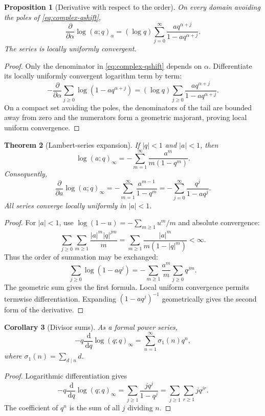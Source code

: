 \documentclass[11pt,oneside,openany]{book}
\newtheorem{theorem}{Theorem}[chapter]
\newtheorem{proposition}[theorem]{Proposition}
\newtheorem{corollary}[theorem]{Corollary}
\theoremstyle{definition}
\theoremstyle{remark}
\newcommand{\dd}{\,\mathrm d}
\newcommand{\abs}[1]{\lvert #1\rvert}
\begin{document}
\begin{proposition}[Derivative with respect to the order]\label{prop:order-derivative}
On every domain avoiding the poles of \eqref{eq:complex-qshift},
\[
 \frac{\partial}{\partial\alpha}\log(a;q)_\alpha
 =(\log q)\sum_{j=0}^{\infty}
 \frac{aq^{\alpha+j}}{1-aq^{\alpha+j}}.
 \tag{1.4}\label{eq:order-derivative}
\]
The series is locally uniformly convergent.
\end{proposition}

\begin{proof}
Only the denominator in \eqref{eq:complex-qshift} depends on $\alpha$.  Differentiate its locally uniformly convergent logarithm term by term:
\[
 -\frac{\partial}{\partial\alpha}
 \sum_{j\ge0}\log(1-aq^{\alpha+j})
 =(\log q)\sum_{j\ge0}
 \frac{aq^{\alpha+j}}{1-aq^{\alpha+j}}.
\]
On a compact set avoiding the poles, the denominators of the tail are bounded away from zero and the numerators form a geometric majorant, proving local uniform convergence.
\end{proof}

\begin{theorem}[Lambert-series expansion]\label{thm:lambert-log}
If $\abs q<1$ and $\abs a<1$, then
\[
 \log(a;q)_\infty
 =-\sum_{m=1}^{\infty}\frac{a^m}{m(1-q^m)}.
\]
Consequently,
\[
 \frac{\partial}{\partial a}\log(a;q)_\infty
 =-\sum_{m=1}^{\infty}\frac{a^{m-1}}{1-q^m}
 =-\sum_{j=0}^{\infty}\frac{q^j}{1-aq^j}.
\]
All series converge locally uniformly in $\abs a<1$.
\end{theorem}

\begin{proof}
For $\abs a<1$, use $\log(1-u)=-\sum_{m\ge1}u^m/m$ and absolute convergence:
\[
 \sum_{j\ge0}\sum_{m\ge1}\frac{\abs a^m\abs q^{jm}}{m}
 =\sum_{m\ge1}\frac{\abs a^m}{m(1-\abs q^m)}<\infty.
\]
Thus the order of summation may be exchanged:
\[
 \sum_{j\ge0}\log(1-aq^j)
 =-\sum_{m\ge1}\frac{a^m}{m}\sum_{j\ge0}q^{jm}.
\]
The geometric sum gives the first formula.  Local uniform convergence permits termwise differentiation.  Expanding $(1-aq^j)^{-1}$ geometrically gives the second form of the derivative.
\end{proof}

\begin{corollary}[Divisor sums]\label{cor:divisor-sum}
As a formal power series,
\[
 -q\frac{\dd}{\dd q}\log(q;q)_\infty
 =\sum_{n=1}^{\infty}\sigma_1(n)q^n,
\]
where $\sigma_1(n)=\sum_{d\mid n}d$.
\end{corollary}

\begin{proof}
Logarithmic differentiation gives
\[
 -q\frac{\dd}{\dd q}\log(q;q)_\infty
 =\sum_{j\ge1}\frac{j q^j}{1-q^j}
 =\sum_{j\ge1}\sum_{r\ge1}j q^{jr}.
\]
The coefficient of $q^n$ is the sum of all $j$ dividing $n$.
\end{proof}
\end{document}
